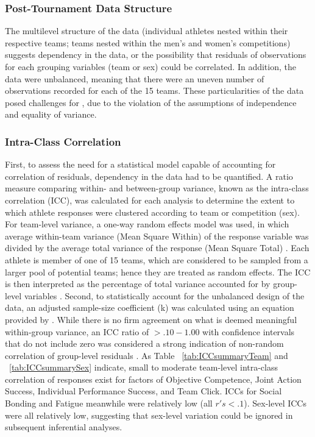\documentclass[12pt]{report}
\begin{document}
{\begin{landscape}
\clearpage




\end{landscape}
\restoregeometry




\subsubsection{Post-Tournament Data Structure}
The multilevel structure of the data (individual athletes nested within their respective teams; teams nested within the men’s and women’s competitions) suggests dependency in the data, or the possibility that residuals of observations for each grouping variables (team or sex) could be correlated. In addition, the data were unbalanced, meaning that there were an uneven number of observations recorded for each of the 15 teams. These particularities of the data posed challenges for , due to the violation of the assumptions of independence and equality of variance.

\subsubsection{Intra-Class Correlation}
First, to assess the need for a statistical model capable of accounting for correlation of residuals, dependency in the data had to be quantified. A ratio measure comparing within- and between-group variance, known as the intra-class correlation (ICC), was calculated for each analysis to determine the extent to which athlete responses were clustered according to team or competition (sex). For team-level variance, a one-way random effects model was used, in which average within-team variance (Mean Square Within) of the response variable was divided by the average total variance of the response (Mean Square Total) \citep{Field2005a}.  Each athlete is member of one of 15 teams, which are considered to be sampled from a larger pool of potential teams; hence they are treated as random effects. The ICC is then interpreted as the percentage of total variance accounted for by group-level variables \citep{Wolak2012}. Second, to statistically account for the unbalanced design of the data, an adjusted sample-size coefficient (k) was calculated using an equation provided by \citep{Lessells1987}.  While there is no firm agreement on what is deemed meaningful within-group variance, an ICC ratio of $> .10-1.00$ with confidence intervals that do not include zero was considered a strong indication of non-random correlation of group-level residuals \citep{Bailey2011}. As Table ~\ref{tab:ICCsummaryTeam} and ~\ref{tab:ICCsummarySex} indicate, small to moderate team-level intra-class correlation of responses exist for factors of Objective Competence, Joint Action Success, Individual Performance Success, and Team Click. ICCs for Social Bonding and Fatigue meanwhile were relatively low (all $r's <.1$). Sex-level ICCs were all relatively low, suggesting that sex-level variation could be ignored in subsequent inferential analyses.\\

}
\end{document}
